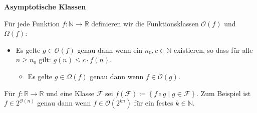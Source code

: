 \begin{defn}
\textbf{Asymptotische Klassen}

Für jede Funktion $f:\mathbb{N}\rightarrow\mathbb{R}$ definieren
wir die Funktionsklassen $\mathcal{O}\left(f\right)$ und $\Omega\left(f\right)$:

\end{defn}
\begin{itemize}
\item Es gelte $g\in\mathcal{O}\left(f\right)$ genau dann wenn ein $n_{0},c\in\mathbb{N}$
existieren, so dass für alle $n\geqslant n_{0}$ gilt: $g\left(n\right)\leqslant c\cdot f\left(n\right)$.
\begin{itemize}
\item Es gelte $g\in\Omega\left(f\right)$ genau dann wenn $f\in\mathcal{O}\left(g\right)$.
\end{itemize}
\end{itemize}
\begin{defn}
Für $f:\mathbb{R}\rightarrow\mathbb{R}$ und eine Klasse $\mathcal{F}$
sei $f\left(\mathcal{F}\right)\coloneqq\left\{ f\circ g\mid g\in\mathcal{F}\right\} $.
Zum Beispiel ist $f\in2^{\mathcal{O}\left(n\right)}$ genau dann wenn
$f\in\mathcal{O}\left(2^{kn}\right)$ für ein festes $k\in\mathbb{N}$.
\end{defn}


